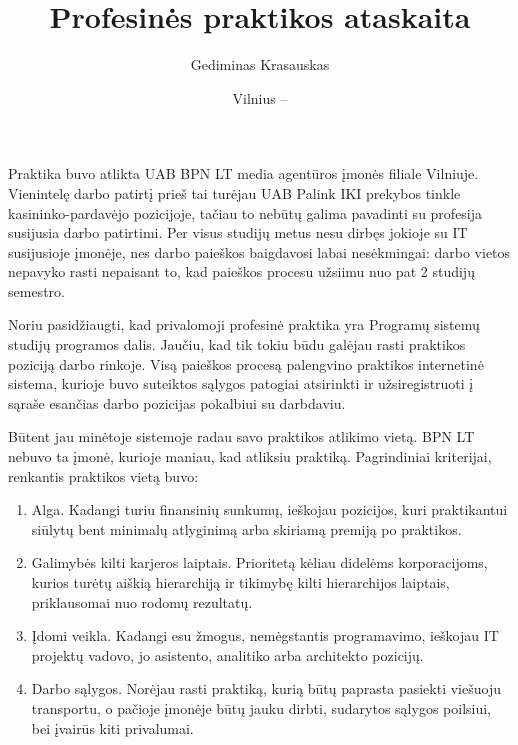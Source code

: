 \documentclass{VUMIFPSkursinis}
\title{Profesinės praktikos ataskaita}
\author{Gediminas Krasauskas}
\date{Vilnius – \the\year}
\begin{document}
\maketitle
\tableofcontents


Praktika buvo atlikta UAB BPN LT media agentūros įmonės filiale Vilniuje. Vienintelę darbo patirtį prieš tai turėjau UAB Palink IKI prekybos tinkle kasininko-pardavėjo pozicijoje, tačiau to nebūtų galima pavadinti su profesija susijusia darbo patirtimi. Per visus studijų metus nesu dirbęs jokioje su IT susijusioje įmonėje, nes darbo paieškos baigdavosi labai nesėkmingai: darbo vietos nepavyko rasti nepaisant to, kad paieškos procesu užsiimu nuo pat 2 studijų semestro.

Noriu pasidžiaugti, kad privalomoji profesinė praktika yra Programų sistemų studijų programos dalis. Jaučiu, kad tik tokiu būdu galėjau rasti praktikos poziciją darbo rinkoje. Visą paieškos procesą palengvino praktikos internetinė sistema, kurioje buvo suteiktos sąlygos patogiai atsirinkti ir užsiregistruoti į sąraše esančias darbo pozicijas pokalbiui su darbdaviu.

Būtent jau minėtoje sistemoje radau savo praktikos atlikimo vietą. BPN LT nebuvo ta įmonė, kurioje maniau, kad atliksiu praktiką. Pagrindiniai kriterijai, renkantis praktikos vietą buvo:

\begin{enumerate}
    \item Alga. Kadangi turiu finansinių sunkumų, ieškojau pozicijos, kuri praktikantui siūlytų bent minimalų atlyginimą arba skiriamą premiją po praktikos.
    \item Galimybės kilti karjeros laiptais. Prioritetą kėliau didelėms korporacijoms, kurios turėtų aiškią hierarchiją ir tikimybę kilti hierarchijos laiptais, priklausomai nuo rodomų rezultatų.
    \item Įdomi veikla. Kadangi esu žmogus, nemėgstantis programavimo, ieškojau IT projektų vadovo, jo asistento, analitiko arba architekto pozicijų.
    \item Darbo sąlygos. Norėjau rasti praktiką, kurią būtų paprasta pasiekti viešuoju transportu, o pačioje įmonėje būtų jauku dirbti, sudarytos sąlygos poilsiui, bei įvairūs kiti privalumai.
\end{enumerate}
\bigskip
\end{document}

